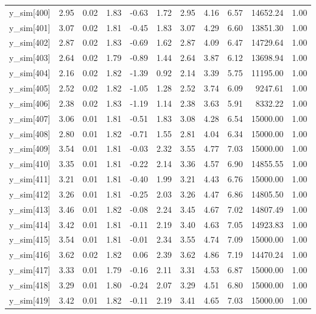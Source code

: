 \begin{table}[ht]
\begin{tabular}{rrrrrrrrrrr}
  y\_sim[400] & 2.95 & 0.02 & 1.83 & -0.63 & 1.72 & 2.95 & 4.16 & 6.57 & 14652.24 & 1.00 \\ 
  y\_sim[401] & 3.07 & 0.02 & 1.81 & -0.45 & 1.83 & 3.07 & 4.29 & 6.60 & 13851.30 & 1.00 \\ 
  y\_sim[402] & 2.87 & 0.02 & 1.83 & -0.69 & 1.62 & 2.87 & 4.09 & 6.47 & 14729.64 & 1.00 \\ 
  y\_sim[403] & 2.64 & 0.02 & 1.79 & -0.89 & 1.44 & 2.64 & 3.87 & 6.12 & 13698.94 & 1.00 \\ 
  y\_sim[404] & 2.16 & 0.02 & 1.82 & -1.39 & 0.92 & 2.14 & 3.39 & 5.75 & 11195.00 & 1.00 \\ 
  y\_sim[405] & 2.52 & 0.02 & 1.82 & -1.05 & 1.28 & 2.52 & 3.74 & 6.09 & 9247.61 & 1.00 \\ 
  y\_sim[406] & 2.38 & 0.02 & 1.83 & -1.19 & 1.14 & 2.38 & 3.63 & 5.91 & 8332.22 & 1.00 \\ 
  y\_sim[407] & 3.06 & 0.01 & 1.81 & -0.51 & 1.83 & 3.08 & 4.28 & 6.54 & 15000.00 & 1.00 \\ 
  y\_sim[408] & 2.80 & 0.01 & 1.82 & -0.71 & 1.55 & 2.81 & 4.04 & 6.34 & 15000.00 & 1.00 \\ 
  y\_sim[409] & 3.54 & 0.01 & 1.81 & -0.03 & 2.32 & 3.55 & 4.77 & 7.03 & 15000.00 & 1.00 \\ 
  y\_sim[410] & 3.35 & 0.01 & 1.81 & -0.22 & 2.14 & 3.36 & 4.57 & 6.90 & 14855.55 & 1.00 \\ 
  y\_sim[411] & 3.21 & 0.01 & 1.81 & -0.40 & 1.99 & 3.21 & 4.43 & 6.76 & 15000.00 & 1.00 \\ 
  y\_sim[412] & 3.26 & 0.01 & 1.81 & -0.25 & 2.03 & 3.26 & 4.47 & 6.86 & 14805.50 & 1.00 \\ 
  y\_sim[413] & 3.46 & 0.01 & 1.82 & -0.08 & 2.24 & 3.45 & 4.67 & 7.02 & 14807.49 & 1.00 \\ 
  y\_sim[414] & 3.42 & 0.01 & 1.81 & -0.11 & 2.19 & 3.40 & 4.63 & 7.05 & 14923.83 & 1.00 \\ 
  y\_sim[415] & 3.54 & 0.01 & 1.81 & -0.01 & 2.34 & 3.55 & 4.74 & 7.09 & 15000.00 & 1.00 \\ 
  y\_sim[416] & 3.62 & 0.02 & 1.82 & 0.06 & 2.39 & 3.62 & 4.86 & 7.19 & 14470.24 & 1.00 \\ 
  y\_sim[417] & 3.33 & 0.01 & 1.79 & -0.16 & 2.11 & 3.31 & 4.53 & 6.87 & 15000.00 & 1.00 \\ 
  y\_sim[418] & 3.29 & 0.01 & 1.80 & -0.24 & 2.07 & 3.29 & 4.51 & 6.80 & 15000.00 & 1.00 \\ 
  y\_sim[419] & 3.42 & 0.01 & 1.82 & -0.11 & 2.19 & 3.41 & 4.65 & 7.03 & 15000.00 & 1.00 \\ 

\end{tabular}
\end{table}
